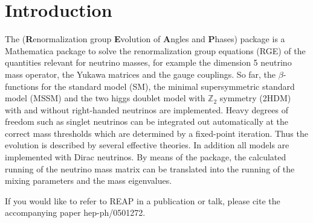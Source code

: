 \section{Introduction}

The  (\textbf{R}enormalization group \textbf{E}volution of \textbf{A}ngles
and \textbf{P}hases) package is a Mathematica package to solve the
renormalization group equations (RGE) of the quantities relevant for neutrino
masses, for example the dimension 5 neutrino mass operator, the Yukawa matrices
and the gauge couplings.  So far, the $\beta$-functions for the standard model
(SM), the minimal supersymmetric standard model (MSSM) and the two higgs doublet
model with $\mathbb{Z}_2$ symmetry (2HDM) with and without right-handed
neutrinos are implemented.  Heavy degrees of freedom such as singlet neutrinos
can be integrated out automatically at the correct mass thresholds which are
determined by a fixed-point iteration. Thus the evolution is described by
several effective theories.
In addition all models are implemented with Dirac neutrinos.  By means of the
 package, the calculated running of the neutrino
mass matrix can be translated into the running of the mixing parameters and the
mass eigenvalues.


If you would like to refer to REAP in a publication or talk, please cite
the accompanying paper hep-ph/0501272.


\endinput
